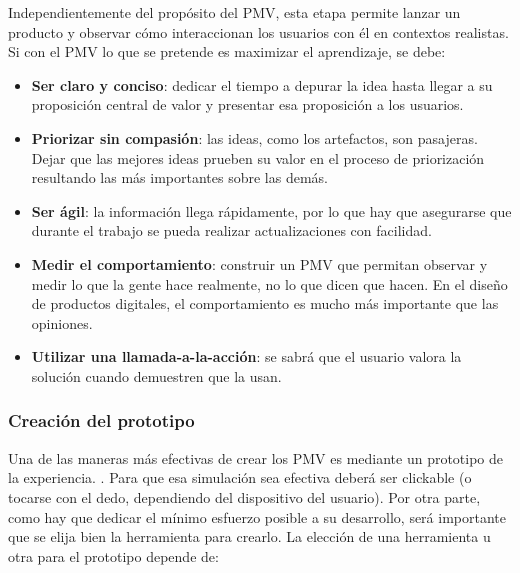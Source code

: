 Independientemente del propósito del PMV, esta etapa permite lanzar un producto y observar cómo interaccionan los usuarios con él en contextos realistas. Si con el PMV lo que se pretende es maximizar el aprendizaje, se debe:
\begin{itemize}
    \item \textbf{Ser claro y conciso}: dedicar el tiempo a depurar la idea hasta llegar a su proposición central de valor y presentar esa proposición a los usuarios. 
    \item \textbf{Priorizar sin compasión}: las ideas, como los artefactos, son pasajeras. Dejar que las mejores ideas prueben su valor en el proceso de priorización resultando las más importantes sobre las demás. 
    \item \textbf{Ser ágil}: la información llega rápidamente, por lo que hay que asegurarse que durante el trabajo se pueda realizar actualizaciones con facilidad. 
    \item \textbf{Medir el comportamiento}: construir un PMV que permitan observar y medir lo que la gente hace realmente, no lo que dicen que hacen. En el diseño de productos digitales, el comportamiento es mucho más importante que las opiniones. 
    \item \textbf{Utilizar una llamada-a-la-acción}: se sabrá que el usuario valora la solución cuando demuestren que la usan.
\end{itemize}

\subsubsection{Creación del prototipo}
Una de las maneras más efectivas de crear los PMV es mediante un prototipo de la experiencia. \citep{Gothelf2013}. Para que esa simulación sea efectiva deberá ser clickable (o tocarse con el dedo, dependiendo del dispositivo del usuario).
Por otra parte, como hay que dedicar el mínimo esfuerzo posible a su desarrollo, será importante que se elija bien la herramienta para crearlo. La elección de una herramienta u otra para el prototipo depende de: 

